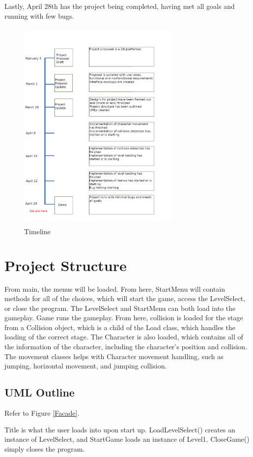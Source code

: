 \documentclass[10pt,conference,onecolumn,compsoc]{IEEEtran}
\begin{document}
Lastly, April 28th has the project being completed, having met all goals and running with few bugs.
\begin{figure}[ht!]
\includegraphics[height=400px, width=300px]{Timeline.jpg}
\caption{Timeline}
\label{Timeline}
\end{figure}


\section{Project Structure}
From main, the menus will be loaded. From here, StartMenu will contain methods for all of the choices, which will start the game, access the LevelSelect, or close the program. The LevelSelect and StartMenu can both load into the gameplay. Game runs the gameplay. From here, collision is loaded for the stage from a Collision object, which is a child of the Load class, which handles the loading of the correct stage. The Character is also loaded, which contains all of the information of the character, including the character’s position and collision. The movement classes helps with Character movement handling, such as jumping, horizontal movement, and jumping collision.

\subsection{UML Outline}
Refer to Figure \ref{Facade}.

Title is what the user loads into upon start up. LoadLevelSelect() creates an instance of LevelSelect, and StartGame loads an instance of Level1. CloseGame() simply closes the program.
\end{document}
